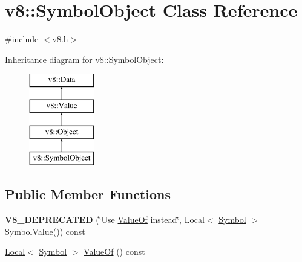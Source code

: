 \hypertarget{classv8_1_1_symbol_object}{}\section{v8\+:\+:Symbol\+Object Class Reference}
\label{classv8_1_1_symbol_object}


{\ttfamily \#include $<$v8.\+h$>$}

Inheritance diagram for v8\+:\+:Symbol\+Object\+:\begin{figure}[H]
\begin{center}
\leavevmode
\includegraphics[height=4.000000cm]{classv8_1_1_symbol_object}
\end{center}
\end{figure}
\subsection*{Public Member Functions}
\begin{DoxyCompactItemize}
\item 
\hypertarget{classv8_1_1_symbol_object_afcbfdaf40972a233ac2267dcd84ee477}{}{\bfseries V8\+\_\+\+D\+E\+P\+R\+E\+C\+A\+T\+E\+D} (\char`\"{}Use \hyperlink{classv8_1_1_symbol_object_a4a3b439c6784a4a8d9bdc5a246e12b85}{Value\+Of} instead\char`\"{}, Local$<$ \hyperlink{classv8_1_1_symbol}{Symbol} $>$ Symbol\+Value()) const \label{classv8_1_1_symbol_object_afcbfdaf40972a233ac2267dcd84ee477}

\item 
\hyperlink{classv8_1_1_local}{Local}$<$ \hyperlink{classv8_1_1_symbol}{Symbol} $>$ \hyperlink{classv8_1_1_symbol_object_a4a3b439c6784a4a8d9bdc5a246e12b85}{Value\+Of} () const 
\end{DoxyCompactItemize}
